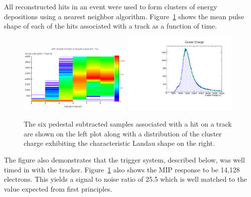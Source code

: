 All reconstructed hits in an event were used to form clusters of energy 
depositions using a nearest neighbor algorithm. Figure~\ref{fig:cluster_pulse}
shows the mean pulse shape of each of the hits associated with a track as a 
function of time.  
\begin{figure}[h]
	\includegraphics[width=0.49\textwidth]{test2012/svtperformance/svt_calib/08062012_run1351_samples_vs_amplitude.png}
	\includegraphics[width=0.49\textwidth]{test2012/svtperformance/svt_calib/run1351_mip_small.pdf}
    \caption{The six pedestal subtracted samples associated with a hit on a track 
             are shown on the left plot along with a distribution of the cluster
             charge exhibiting the characteristic Landau shape on the right. 
            }
	\label{fig:cluster_pulse}
\end{figure}
The figure also demonstrates that  the trigger system, described below, was well 
timed in with the tracker. Figure~\ref{fig:cluster_pulse} also shows the MIP 
response to be 14,128 electrons. This yields a signal to noise ratio
of 25.5 which is well matched to the value expected from first principles.


 
